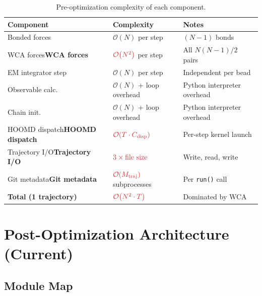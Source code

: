 \documentclass[12pt,a4paper]{article}
\newcommand{\Obig}[1]{\mathcal{O}\!\left(#1\right)}
\newcommand{\bad}[1]{\ifmmode\textcolor{oldred}{#1}\else\textcolor{oldred}{\textbf{#1}}\fi}
\newcommand{\code}[1]{\texttt{#1}}
\begin{document}
\begin{table}[h]
\centering
\caption{Pre-optimization complexity of each component.}
\label{tab:old-complexity}
\begin{tabular}{lll}
\toprule
Component & Complexity & Notes \\
\midrule
Bonded forces       & $\Obig{N}$ per step    & $(N-1)$ bonds \\
\bad{WCA forces}    & $\bad{\Obig{N^2}}$ per step & All $N(N-1)/2$ pairs \\
EM integrator step  & $\Obig{N}$ per step    & Independent per bead \\
Observable calc.    & $\Obig{N}$ + loop overhead & Python interpreter overhead \\
Chain init.         & $\Obig{N}$ + loop overhead & Python interpreter overhead \\
\bad{HOOMD dispatch}& $\bad{\Obig{T \cdot C_\text{disp}}}$ & Per-step kernel launch \\
\bad{Trajectory I/O}& $\bad{3\times \text{file size}}$ & Write, read, write \\
\bad{Git metadata}  & $\bad{\Obig{M_\text{traj}}}$ subprocesses & Per \code{run()} call \\
\midrule
\textbf{Total (1 trajectory)} & $\bad{\Obig{N^2 \cdot T}}$ & Dominated by WCA \\
\bottomrule
\end{tabular}
\end{table}

\section{Post-Optimization Architecture (Current)}
\label{sec:new}

\subsection{Module Map}
\label{sec:new-map}
\end{document}
